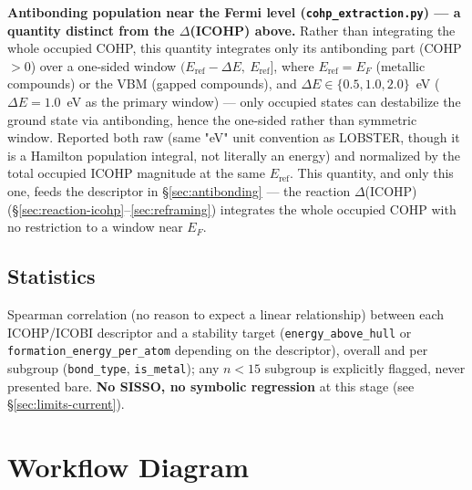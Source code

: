 \documentclass[11pt,a4paper]{article}
\begin{document}
\textbf{Antibonding population near the Fermi level
(\texttt{cohp\_extraction.py}) --- a quantity distinct from the
$\Delta$(ICOHP) above.} Rather than integrating the whole occupied COHP,
this quantity integrates only its antibonding part (COHP$>0$) over a
one-sided window $(E_\text{ref}-\Delta E,\ E_\text{ref}]$, where
$E_\text{ref}=E_F$ (metallic compounds) or the VBM (gapped compounds),
and $\Delta E \in \{0.5, 1.0, 2.0\}$~eV ($\Delta E=1.0$~eV as the primary
window) --- only occupied states can destabilize the ground state via
antibonding, hence the one-sided rather than symmetric window. Reported
both raw (same "eV" unit convention as LOBSTER, though it is a Hamilton
population integral, not literally an energy) and normalized by the
total occupied ICOHP magnitude at the same $E_\text{ref}$. This
quantity, and only this one, feeds the descriptor in
\S\ref{sec:antibonding} --- the reaction $\Delta$(ICOHP)
(\S\ref{sec:reaction-icohp}--\ref{sec:reframing}) integrates the whole
occupied COHP with no restriction to a window near $E_F$.

\subsection{Statistics}

Spearman correlation (no reason to expect a linear relationship) between
each ICOHP/ICOBI descriptor and a stability target
(\texttt{energy\_above\_hull} or \texttt{formation\_energy\_per\_atom}
depending on the descriptor), overall and per subgroup
(\texttt{bond\_type}, \texttt{is\_metal}); any $n<15$ subgroup is
explicitly flagged, never presented bare. \textbf{No SISSO, no symbolic
regression} at this stage (see \S\ref{sec:limits-current}).

\section{Workflow Diagram}
\end{document}
